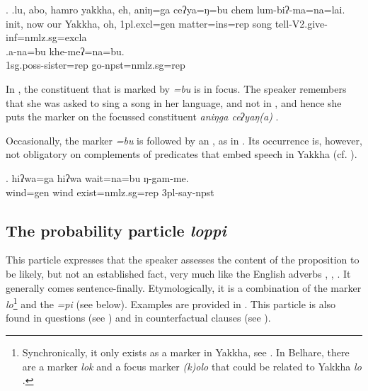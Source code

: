  \ex. \ag.\label{lu}lu,   abo, hamro yakkha,    eh, aniŋ=ga  ceʔya=ŋ=bu chem lum-biʔ-ma=na=lai.\\
 {\sc init}, now our Yakkha, oh, {\sc 1pl.excl=gen} matter{\sc =ins=rep} song tell{\sc -V2.give-inf=nmlz.sg=excla}\\
 \bg.a-na=bu      khe-meʔ=na=bu.\\
{\sc 1sg.poss-}sister{\sc =rep} go{\sc [3sg]-npst=nmlz.sg=rep}\\
  
 
In \Last[a], the constituent that is marked by \emph{=bu} is in focus. The speaker remembers that she was asked to sing a song in her language, and not in , and hence she puts the  marker on the focussed constituent \emph{aniŋga ceʔyaŋ(a)} .


Occasionally, the  marker \emph{=bu} is followed by an , as in \Next. Its occurrence is, however, not obligatory on complements of predicates that embed speech in Yakkha (cf. ).
 
 \exg. hiʔwa=ga hiʔwa wait=na=bu  ŋ-gam-me.\\
 wind{\sc =gen} wind exist{\sc [npst;3sg]=nmlz.sg=rep} {\sc 3pl-}say{\sc -npst}\\
 


\subsection{The probability particle \emph{loppi}}

This particle expresses that the speaker assesses the content of the proposition to be likely, but not an established fact, very much like the English adverbs , , . It generally comes sentence-finally. Etymologically, it is a combination of the marker \emph{lo}\footnote{Synchronically, it only exists  as a  marker in Yakkha, see . In Belhare, there are a  marker \emph{lok} and a focus marker \emph{(k)olo} that could be related to Yakkha \emph{lo} \citep{Bickel2003Belhare}.} and the  \emph{=pi} (see below). Examples are provided in \Next. This particle is also found in questions (see \Next[b]) and in counterfactual clauses (see ). 

